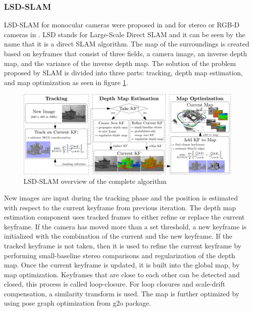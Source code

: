 \subsubsection{LSD-SLAM}

LSD-SLAM for monocular cameras were proposed in \cite{engel2014lsd} and for stereo or RGB-D cameras in \cite{engel2015large}.
LSD stands for Large-Scale Direct SLAM and it can be seen by the name that it is a direct SLAM algorithm.
The map of the surroundings is created based on keyframes that consist of three fields, a camera image, an inverse depth map,
and the variance of the inverse depth map. The solution of the problem proposed by SLAM is divided into three parts: tracking,
depth map estimation, and map optimization as seen in figure \ref{fig:lsd_slam_overview}.


\begin{figure}[!ht]
    \centering
    \includegraphics[width=150mm, keepaspectratio]{figures/lsd_slam_overview.png}
    \caption{LSD-SLAM overview of the complete algorithm \cite{engel2014lsd}}
    \label{fig:lsd_slam_overview}
\end{figure}

New images are input during the tracking phase and the position is estimated with respect to the current keyframe from 
previous iteration. The depth map estimation component uses tracked frames to either refine or replace the current keyframe.
If the camera has moved more than a set threshold, a new keyframe is initialized with the combination of the current and the new 
keyframe. If the tracked keyframe is not taken, then it is used to refine the current keyframe by performing small-baseline 
stereo comparisons and regularization of the depth map. Once the current keyframe is updated, it is built into the global map,
by map optimization.
Keyframes that are close to each other can be detected and closed, this process is called loop-closure. For loop closures and
scale-drift compensation, a similarity transform is used. The map is further optimized by using pose graph optimization from 
g2o package.

